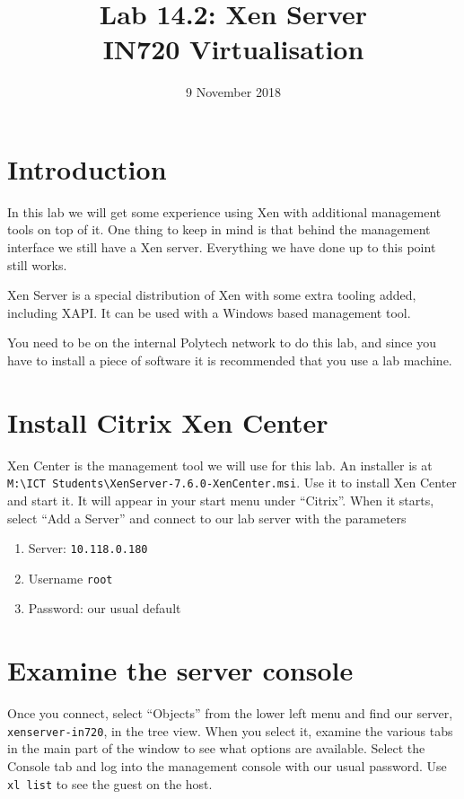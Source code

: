 \documentclass{article}
\begin{document}
\title{Lab 14.2: Xen Server\\ IN720 Virtualisation}
\date{9 November 2018}
\maketitle

\section*{Introduction}
In this lab we will get some experience using Xen with additional management tools on top of it. One thing to keep in mind is that behind the management interface we still have a Xen server. Everything we have done up to this point still works.

Xen Server is a special distribution of Xen with some extra tooling added, including XAPI. It can be used with a Windows 
based management tool. 

You need to be on the internal Polytech network to do this lab, and since you have to install a piece of software it is recommended that you use a lab machine.
 
 \section{Install Citrix Xen Center}
 Xen Center is the management tool we will use for this lab. An installer is at \\
 \texttt{M:{\textbackslash}ICT Students{\textbackslash}XenServer-7.6.0-XenCenter.msi}. Use it to install
 Xen Center and start it. It will appear in your start menu under ``Citrix''. When it starts, select ``Add a Server'' and connect to our lab server with the parameters
 
 \begin{enumerate}
  \item Server: \texttt{10.118.0.180}
  \item Username \texttt{root}
  \item Password: our usual default
  \end{enumerate}
  
  
  
  \section{Examine the server console}
 
 Once you connect, select ``Objects'' from the lower left menu and find our server, \texttt{xenserver-in720}, in the tree 
 view. When you select it, examine the various tabs in the main part of the window to see what options are available. 
 Select the Console tab and log into the management console with our usual password. Use \texttt{xl list} to see the guest on the host.
 
\end{document}
